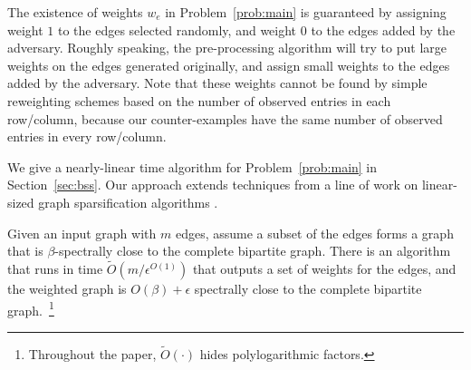 The existence of weights $w_e$ in Problem~\ref{prob:main} is guaranteed by assigning weight $1$ to the edges selected randomly, and weight $0$ to the edges added by the adversary. Roughly speaking, the pre-processing algorithm will try to put large weights on the edges generated originally, and assign small weights to the edges added by the adversary. %
Note that these weights cannot be found by simple reweighting schemes based on the number of observed entries in each row/column, because our counter-examples have the same number of observed entries in every row/column. %

We give a nearly-linear time algorithm for Problem~\ref{prob:main} in Section~\ref{sec:bss}.
Our approach extends techniques from a line of work on linear-sized graph sparsification algorithms \citep{BatsonSS12, AllenLO15, LeeS17}.%


\begin{theorem}
\label{thm:preprocess-informal}
Given an input graph with $m$ edges, assume a subset of the edges forms a graph that is $\beta$-spectrally close to the complete bipartite graph. There is an algorithm that runs in time $\tilde{O}(m/\epsilon^{O(1)})$ that outputs a set of weights for the edges, and the weighted graph is $O(\beta)+\epsilon$ spectrally close to the complete bipartite graph.~\footnote{Throughout the paper, $\tilde O(\cdot)$ hides polylogarithmic factors.}
\end{theorem}

